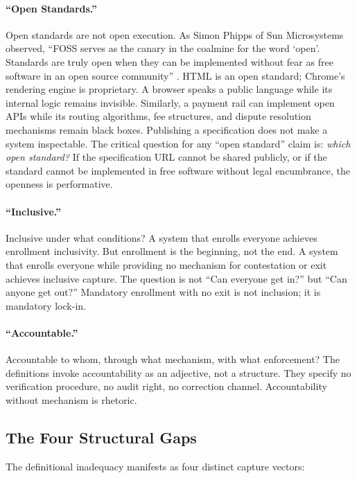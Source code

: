 \documentclass{article}
\begin{document}
\paragraph{``Open Standards.''}  Open standards are not open execution. As Simon Phipps of Sun Microsystems observed, ``FOSS serves as the canary in the coalmine for the word `open'. Standards are truly open when they can be implemented without fear as free software in an open source community'' \citep{phipps2007}. HTML is an open standard; Chrome's rendering engine is proprietary. A browser speaks a public language while its internal logic remains invisible. Similarly, a payment rail can implement open APIs while its routing algorithms, fee structures, and dispute resolution mechanisms remain black boxes. Publishing a specification does not make a system inspectable. The critical question for any ``open standard'' claim is: \textit{which open standard?} If the specification URL cannot be shared publicly, or if the standard cannot be implemented in free software without legal encumbrance, the openness is performative.

\paragraph{``Inclusive.''}  Inclusive under what conditions? A system that enrolls everyone achieves enrollment inclusivity. But enrollment is the beginning, not the end. A system that enrolls everyone while providing no mechanism for contestation or exit achieves inclusive capture. The question is not ``Can everyone get in?'' but ``Can anyone get out?'' Mandatory enrollment with no exit is not inclusion; it is mandatory lock-in.

\paragraph{``Accountable.''}  Accountable to whom, through what mechanism, with what enforcement? The definitions invoke accountability as an adjective, not a structure. They specify no verification procedure, no audit right, no correction channel. Accountability without mechanism is rhetoric.

\subsection{The Four Structural Gaps}

The definitional inadequacy manifests as four distinct capture vectors:
\end{document}
